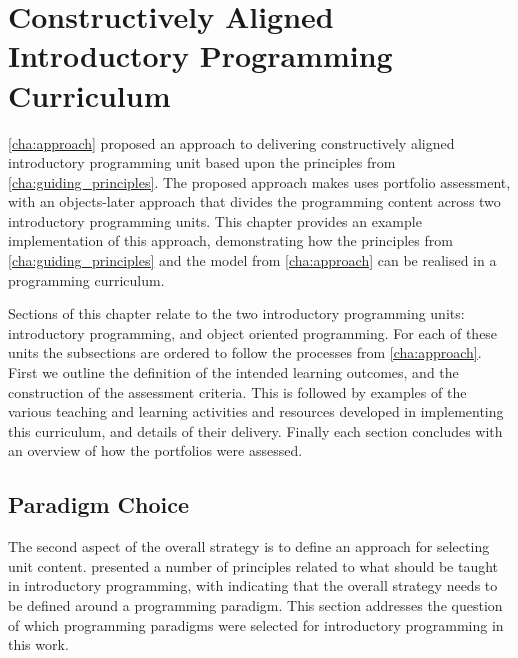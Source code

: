 
\chapter{Constructively Aligned Introductory Programming Curriculum} %
\label{cha:example_impl}

\graphicspath{{Figures/CAIntroProg/}}

\cref{cha:approach} proposed an approach to delivering constructively aligned introductory programming unit based upon the principles from \cref{cha:guiding_principles}. The proposed approach makes uses portfolio assessment, with an objects-later approach that divides the programming content across two introductory programming units. This chapter provides an example implementation of this approach, demonstrating how the principles from \cref{cha:guiding_principles} and the model from \cref{cha:approach} can be realised in a programming curriculum.

Sections of this chapter relate to the two introductory programming units: introductory programming, and object oriented programming. For each of these units the subsections are ordered to follow the processes from \cref{cha:approach}. First we outline the definition of the intended learning outcomes, and the construction of the assessment criteria. This is followed by examples of the various teaching and learning activities and resources developed in implementing this curriculum, and details of their delivery. Finally each section concludes with an overview of how the portfolios were assessed.


\section{Paradigm Choice} %
\label{sec:paradigm_choice}

The second aspect of the overall strategy is to define an approach for selecting unit content.  presented a number of principles related to what should be taught in introductory programming, with  indicating that the overall strategy needs to be defined around a programming paradigm. This section addresses the question of which programming paradigms were selected for introductory programming in this work.

%
%

